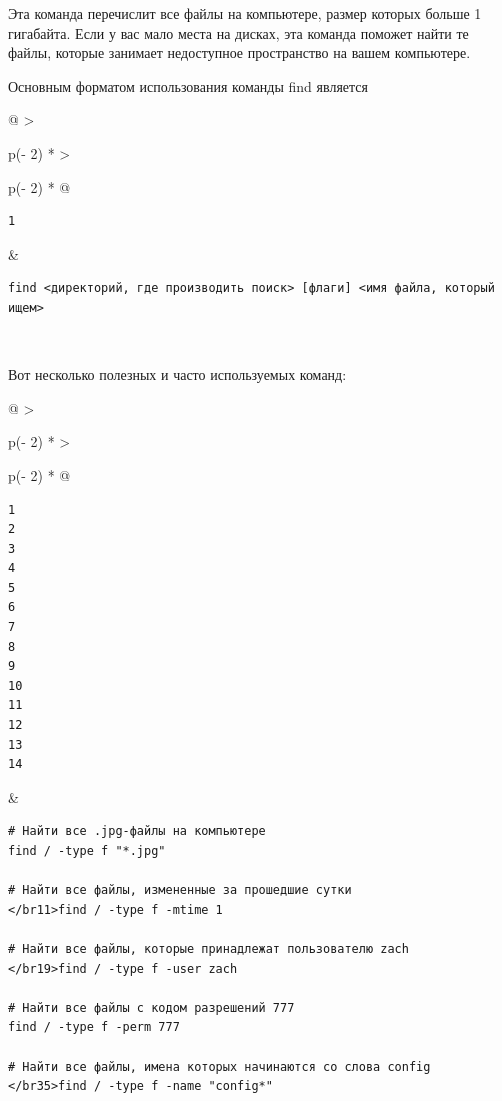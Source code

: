 \documentclass{article}
\begin{document}
Эта команда перечислит все файлы на компьютере, размер которых больше 1
гигабайта. Если у вас мало места на дисках, эта команда поможет найти те
файлы, которые занимает недоступное пространство на вашем компьютере.

Основным форматом использования команды find является

\begin{longtable}[]{@{}
  >{\raggedright\arraybackslash}p{(\columnwidth - 2\tabcolsep) * }
  >{\raggedright\arraybackslash}p{(\columnwidth - 2\tabcolsep) * }@{}}
\toprule
\endhead
\begin{minipage}[t]{\linewidth}\raggedright
\begin{verbatim}
1
\end{verbatim}
\end{minipage} & \begin{minipage}[t]{\linewidth}\raggedright
\begin{verbatim}
find <директорий, где производить поиск> [флаги] <имя файла, который ищем>
\end{verbatim}
\end{minipage} \\ \addlinespace
\bottomrule
\end{longtable}

Вот несколько полезных и часто используемых команд:

\begin{longtable}[]{@{}
  >{\raggedright\arraybackslash}p{(\columnwidth - 2\tabcolsep) * }
  >{\raggedright\arraybackslash}p{(\columnwidth - 2\tabcolsep) * }@{}}
\toprule
\endhead
\begin{minipage}[t]{\linewidth}\raggedright
\begin{verbatim}
1
2
3
4
5
6
7
8
9
10
11
12
13
14
\end{verbatim}
\end{minipage} & \begin{minipage}[t]{\linewidth}\raggedright
\begin{verbatim}
# Найти все .jpg-файлы на компьютере
find / -type f "*.jpg"

# Найти все файлы, измененные за прошедшие сутки
</br11>find / -type f -mtime 1

# Найти все файлы, которые принадлежат пользователю zach
</br19>find / -type f -user zach

# Найти все файлы с кодом разрешений 777
find / -type f -perm 777

# Найти все файлы, имена которых начинаются со слова config
</br35>find / -type f -name "config*"
\end{verbatim}
\end{minipage} \\ \addlinespace
\bottomrule
\end{longtable}
\end{document}
